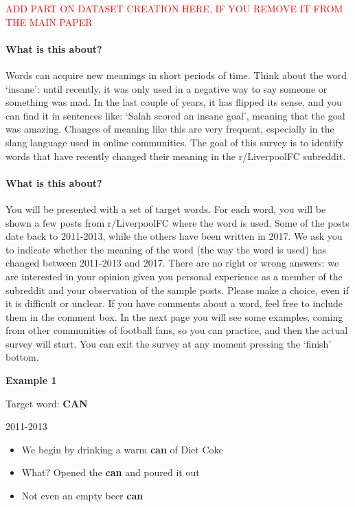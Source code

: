 \documentclass[11pt,a4paper]{article}
\begin{document}
\begin{minipage}{15cm}

\textcolor{red}{ADD PART ON DATASET CREATION HERE, IF YOU REMOVE IT FROM THE MAIN PAPER}

\paragraph{What is this about?}
Words can acquire new meanings in short periods of time. Think about the word `insane': until recently, it was only used in a negative way to say someone or something was mad. In the last couple of years, it has flipped its sense, and you can find it in sentences like: `Salah scored an insane goal', meaning that the goal was amazing.
Changes of meaning like this are very frequent, especially in the slang language used in online communities. The goal of this survey is to identify words that have recently changed their meaning in the r/LiverpoolFC subreddit.
\\
\paragraph{What is this about?}
You will be presented with a set of target words. For each word, you will be shown a few posts from r/LiverpoolFC where the word is used. Some of the posts date back to 2011-2013, while the others have been written in 2017.
We ask you to indicate whether the meaning of the word (the way the word is used) has changed between 2011-2013 and 2017. There are no right or wrong answers: we are interested in your opinion given you personal experience as a member of the subreddit and your observation of the sample posts. Please make a choice, even if it is difficult or unclear. If you have comments about a word, feel free to include them in the comment box. In the next page you will see some examples, coming from other communities of football fans, so you can practice, and then the actual survey will start. You can exit the survey at any moment pressing the `finish' bottom. 

\vspace*{0.5cm}

\textbf{Example 1}

\vspace*{0.5cm}

Target word: \textbf{CAN}

\vspace*{0.25cm}
2011-2013
\begin{itemize}
\item We begin by drinking a warm \textbf{can} of Diet Coke
\item What? Opened the \textbf{can} and poured it out
\item Not even an empty beer \textbf{can}
\end{itemize}


\end{minipage}
\end{document}
